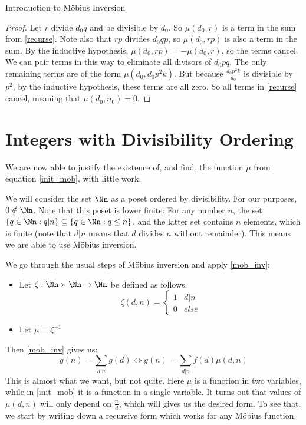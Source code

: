 \documentclass[12pt]{pom_thesis}
\begin{document}
\begin{chapter}{Introduction to M\"obius Inversion}
\begin{proof}
Let $r$ divide $d_0q$ and be divisible by $d_0$. So $\mu(d_0, r)$ is a term in the sum from \ref{recurse}. Note also that $rp$ divides $d_0qp$, so $\mu(d_0, rp)$ is also a term in the sum. By the inductive hypothesis, $\mu(d_0, rp) = -\mu(d_0, r)$, so the terms cancel. We can pair terms in this way to eliminate all divisors of $d_0pq$. The only remaining terms are of the form $\mu(d_0, d_0p^2k)$. But because $\frac{d_0p^2k}{d_0}$ is divisible by $p^2$, by the inductive hypothesis, these terms are all zero. So all terms in \ref{recurse} cancel, meaning that $\mu(d_0, n_0) = 0$.
\end{proof}








\section{Integers with Divisibility Ordering} %
We are now able to justify the existence of, and find, the function $\mu$ from equation \ref{init_mob}, with little work.

We will consider the set $\Nn$ as a poset ordered by divisibility. For our purposes, $0 \notin \Nn$. Note that this poset is lower finite: For any number $n$, the set $\{q \in \Nn: q|n\} \subseteq \{q \in \Nn: q \leq n\}$, and the latter set contains $n$ elements, which is finite (note that $d|n$ means that $d$ divides $n$ without remainder). This means we are able to use M\"obius inversion.

We go through the usual steps of M\"obius inversion and apply \ref{mob_inv}:
\begin{itemize}
\item Let $\zeta: \Nn \times \Nn \rightarrow \Nn$ be defined as follows.
\[
\zeta(d,n) = \begin{cases}1 & d|n \\ 0 & else \end{cases}
\]
\item Let $\mu = \zeta^{-1}$ 
\end{itemize}
Then \ref{mob_inv} gives us:
\[
g(n) = \sum_{d | n} g(d) \iff g(n) = \sum_{d | n}  f(d)\mu(d,n)
\]
This is almost what we want, but not quite. Here $\mu$ is a function in two variables, while in \ref{init_mob} it is a function in a single variable. It turns out that values of $\mu(d,n)$ will only depend on $\frac nd$, which will gives us the desired form. To see that, we start by writing down a recursive form which works for any M\"obius function.


\end{chapter}
\end{document}
